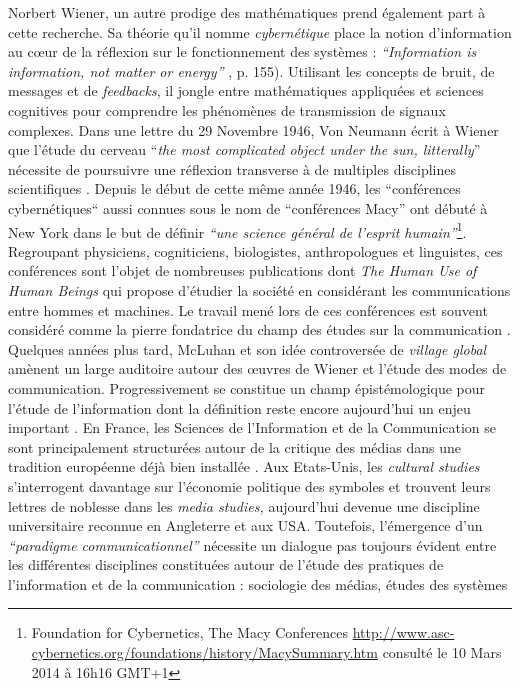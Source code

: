 Norbert Wiener, un autre prodige des mathématiques prend également part à cette recherche. Sa théorie qu{\textquoteright}il nomme \textit{cybernétique }place la notion d{\textquoteright}information au c{\oe}ur de la réflexion sur le fonctionnement des systèmes : \textit{{\textquotedblleft}Information is information, not matter or energy{\textquotedblright}} \citep{Neumann1948}, p. 155). Utilisant les concepts de bruit, de messages et de \textit{feedbacks}, il jongle entre mathématiques appliquées et sciences cognitives pour comprendre les phénomènes de transmission de signaux complexes. Dans une lettre du 29 Novembre 1946, Von Neumann écrit à Wiener que l{\textquoteright}étude du cerveau {\textquotedblleft}\textit{the most complicated object under the sun, litterally}{\textquotedblright} nécessite de poursuivre une réflexion transverse à de multiples disciplines scientifiques \citep{Masani1990}. Depuis le début de cette m\^eme année 1946, les {\textquotedblleft}conférences cybernétiques{\textquotedblleft} aussi connues sous le nom de {\textquotedblleft}conférences Macy{\textquotedblright} ont débuté à New York dans le but de définir \textit{{\textquotedblleft}une science général de l{\textquoteright}esprit humain{\textquotedblright}}\footnote{ Foundation for Cybernetics, The Macy Conferences \url{http://www.asc-cybernetics.org/foundations/history/MacySummary.htm} consulté le 10 Mars 2014 à 16h16 GMT+1}. Regroupant physiciens, cogniticiens, biologistes, anthropologues et linguistes, ces conférences sont l{\textquoteright}objet de nombreuses publications dont \textit{The Human Use of Human Beings} \citep{Wiener1988} qui propose d{\textquoteright}étudier la société en considérant les communications entre hommes et machines. Le travail mené lors de ces conférences est souvent considéré comme la pierre fondatrice du champ des études sur la communication \citep{Breton1997, Winkin1981}. Quelques années plus tard, McLuhan et son idée controversée de \textit{village global} \citep{McLuhan1962} amènent un large auditoire autour des {\oe}uvres de Wiener et l{\textquoteright}étude des modes de communication. Progressivement se constitue un champ épistémologique pour l{\textquoteright}étude de l{\textquoteright}information dont la définition reste encore aujourd{\textquoteright}hui un enjeu important \citep{Wolton1997}. En France, les Sciences de l{\textquoteright}Information et de la Communication se sont principalement structurées autour de la critique des médias \citep{Mattelart1986, Debray1991} dans une tradition européenne déjà bien installée \citep{Adorno2005}. Aux Etats-Unis, les \textit{cultural studies }\citep{Hall2003} s{\textquoteright}interrogent davantage sur l{\textquoteright}économie politique des symboles et trouvent leurs lettres de noblesse dans les \textit{media studies, }aujourd{\textquoteright}hui devenue une discipline universitaire reconnue en Angleterre et aux USA. Toutefois, l{\textquoteright}émergence d{\textquoteright}un \textit{{\textquotedblleft}paradigme communicationnel{\textquotedblright} }\citep{Bougnoux1993} nécessite un dialogue pas toujours évident entre les différentes disciplines constituées autour de l{\textquoteright}étude des pratiques de l{\textquoteright}information et de la communication : sociologie des médias, études des systèmes 